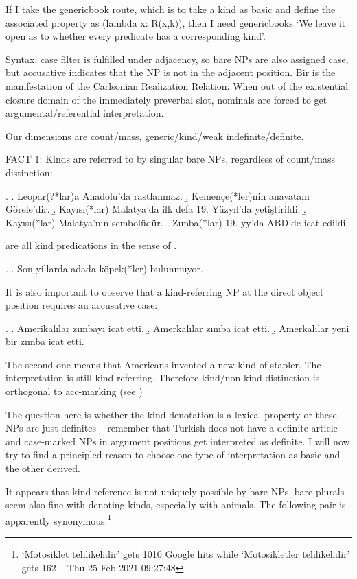 \documentclass[11pt,a4paper]{article}
\begin{document}
If I take the genericbook route, which is to take a kind as basic and define the associated property as (lambda x: R(x,k)), then I need genericbooks `We leave it open as to whether every predicate has a corresponding kind'.

Syntax: case filter is fulfilled under adjacency, so bare NPs are also assigned case, but accusative indicates that the NP is not in the adjacent position. Bir is the manifestation of the Carlsonian Realization Relation. When out of the existential closure domain of the immediately preverbal slot, nominals are forced to get argumental/referential interpretation.

\begin{comment}
Krifkaetal
* p87 incorporation and kind-reference.
\end{comment}

Our dimensions are count/mass, generic/kind/weak indefinite/definite.

FACT 1: Kinds are referred to by singular bare NPs, regardless of count/mass distinction:

\ex.
\a. Leopar(?*lar)a Anadolu'da rastlanmaz.
\b. Kemençe(*ler)nin anavatanı Görele'dir.
\b. Kayısı(*lar) Malatya'da ilk defa 19. Yüzyıl'da yetiştirildi. 
\b. Kayısı(*lar) Malatya'nın sembolüdür.
\b. Zımba(*lar) 19. yy'da ABD'de icat edildi.

are all kind predications in the sense of .


\ex.
\a. Son yillarda adada köpek(*ler) bulunmuyor.



It is also important to observe that a kind-referring NP at the direct object position requires an accusative case:

\ex.
\a. Amerikalılar zımbayı icat etti.
\b. Amerkalılar zımba icat etti.
\b. Amerkalılar yeni bir zımba icat etti.

The second one means that Americans invented a new kind of stapler. The interpretation is still kind-referring. Therefore kind/non-kind distinction is orthogonal to acc-marking (see )

The question here is whether the kind denotation is a lexical property or these NPs are just definites -- remember that Turkish does not have a definite article and case-marked NPs in argument positions get interpreted as definite. I will now try to find a principled reason to choose one type of interpretation as basic and the other derived.

It appears that kind reference is not uniquely possible by bare NPs, bare plurals seem also fine with denoting kinds, especially with animals. The following pair is apparently synonymous:\footnote{`Motosiklet tehlikelidir' gets 1010 Google hits while `Motosikletler tehlikelidir' gets 162 -- Thu 25 Feb 2021 09:27:48}
\end{document}
